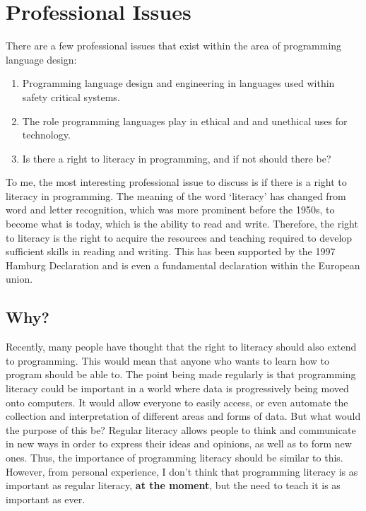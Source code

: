 \chapter{Professional Issues}
\label{chap:professional-issues}

There are a few professional issues that exist within the area of programming language design:

\begin{enumerate}
    \item Programming language design and engineering in languages used within safety critical systems.
    \item The role programming languages play in ethical and and unethical uses for technology.
    \item Is there a right to literacy in programming, and if not should there be?
\end{enumerate}

To me, the most interesting professional issue to discuss is if there is a right to literacy in programming. The meaning of the word `literacy' has changed from word and letter recognition, which was more prominent before the 1950s, to become what is today, which is the ability to read and write\textsuperscript{\cite{gee_1991}}. Therefore, the right to literacy is the right to acquire the resources and teaching required to develop sufficient skills in reading and writing. This has been supported by the 1997 Hamburg Declaration\textsuperscript{\cite{hamburg_1997}} and is even a fundamental declaration within the European union\textsuperscript{\cite{edrl_2016}}.

\section{Why?}

Recently, many people have thought that the right to literacy should also extend to programming. This would mean that anyone who wants to learn how to program should be able to. The point being made regularly is that programming literacy could be important in a world where data is progressively being moved onto computers. It would allow everyone to easily access, or even automate the collection and interpretation of different areas and forms of data. But what would the purpose of this be? Regular literacy allows people to think and communicate in new ways in order to express their ideas and opinions, as well as to form new ones. Thus, the importance of programming literacy should be similar to this. However, from personal experience, I don't think that programming literacy is as important as regular literacy, \textbf{at the moment}, but the need to teach it is as important as ever.

